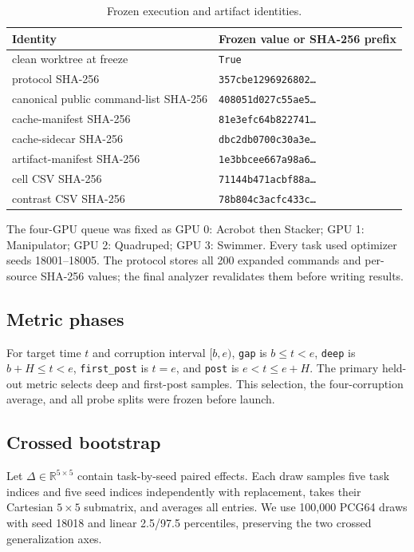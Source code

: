 \begin{table}[H]
\centering
\caption{Frozen execution and artifact identities.}
\label{tbl:artifact-identities}
\footnotesize
\begin{tabular}{@{}ll@{}}
\toprule
\textcolor{NVIDIADark}{\textbf{Identity}} & \textcolor{NVIDIADark}{\textbf{Frozen value or SHA-256 prefix}} \\
\midrule
clean worktree at freeze & \texttt{True} \\
protocol SHA-256 & \texttt{357cbe1296926802\ldots} \\
canonical public command-list SHA-256 & \texttt{408051d027c55ae5\ldots} \\
cache-manifest SHA-256 & \texttt{81e3efc64b822741\ldots} \\
cache-sidecar SHA-256 & \texttt{dbc2db0700c30a3e\ldots} \\
artifact-manifest SHA-256 & \texttt{1e3bbcee667a98a6\ldots} \\
cell CSV SHA-256 & \texttt{71144b471acbf88a\ldots} \\
contrast CSV SHA-256 & \texttt{78b804c3acfc433c\ldots} \\
\bottomrule
\end{tabular}
\end{table}

The four-GPU queue was fixed as GPU 0: Acrobot then Stacker; GPU 1:
Manipulator; GPU 2: Quadruped; GPU 3: Swimmer. Every task used optimizer
seeds 18001--18005. The protocol stores all 200 expanded commands and
per-source SHA-256 values; the final analyzer revalidates them before
writing results.

\subsection{Metric phases}\label{metric-phases}

For target time \(t\) and corruption interval \([b,e)\),
\texttt{gap} is \(b\le t<e\), \texttt{deep} is \(b+H\le t<e\),
\texttt{first\_post} is \(t=e\), and \texttt{post} is
\(e<t\le e+H\). The primary held-out metric selects deep and first-post
samples. This selection, the four-corruption average, and all probe
splits were frozen before launch.

\subsection{Crossed bootstrap}\label{crossed-bootstrap}

Let \(\Delta\in\mathbb R^{5\times5}\) contain task-by-seed paired effects. Each draw samples
five task indices and five seed indices independently with replacement,
takes their Cartesian \(5\times5\) submatrix, and averages all entries.
We use 100,000 PCG64 draws with seed 18018 and linear 2.5/97.5
percentiles, preserving the two crossed generalization axes.

